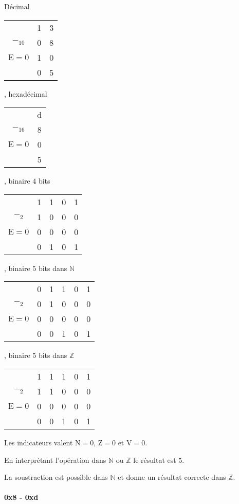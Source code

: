 \documentclass[french, 12pt, a4paper]{article}
\begin{document}
Décimal
\begin{tabular}[c]{ccc}
					& 1 & 3	\\
$-_{10}$			& 0 & 8 \\
$\mathrm{E} = 0$	& 1 & 0 \\	\cline{2-3}
					& 0 & 5 \\
\end{tabular}
, hexadécimal
\begin{tabular}[c]{cc}
					& d	\\
$-_{16}$			& 8 \\
$\mathrm{E} = 0$	& 0 \\	\cline{2-2}
					& 5 \\
\end{tabular}
, binaire $4$ bits
\begin{tabular}[c]{ccccc}
					& 1 & 1 & 0 & 1	\\
$-_2$				& 1 & 0 & 0 & 0 \\
$\mathrm{E} = 0$ 	& 0 & 0 & 0 & 0 \\	\cline{2-5}
					& 0 & 1 & 0 & 1 \\
\end{tabular}
, binaire $5$ bits dans $\mathbb{N}$
\begin{tabular}[c]{cccccc}
					& 0 & 1 & 1 & 0 & 1	\\
$-_2$				& 0 & 1 & 0 & 0 & 0 \\
$\mathrm{E} = 0$ 	& 0 & 0 & 0 & 0 & 0 \\	\cline{2-6}
					& 0 & 0 & 1 & 0 & 1 \\
\end{tabular}
, binaire $5$ bits dans $\mathbb{Z}$
\begin{tabular}[c]{cccccc}
					& 1 & 1 & 1 & 0 & 1	\\
$-_2$				& 1 & 1 & 0 & 0 & 0 \\
$\mathrm{E} = 0$ 	& 0 & 0 & 0 & 0 & 0 \\	\cline{2-6}
					& 0 & 0 & 1 & 0 & 1 \\
\end{tabular}

Les indicateurs valent $\mathrm{N} = 0$, $\mathrm{Z} = 0$ et $\mathrm{V} = 0$.

En interprétant l'opération dans $\mathbb{N}$ ou $\mathbb{Z}$ le résultat est $5$.

La soustraction est possible dans $\mathbb{N}$ et donne un résultat correcte dans $\mathbb{Z}$.

\paragraph{0x8 - 0xd}
\end{document}
